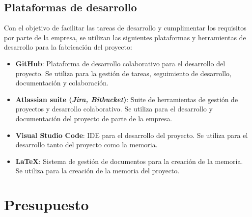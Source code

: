 \subsection{Plataformas de desarrollo}\label{subsec:plataformas}
Con el objetivo de facilitar las tareas de desarrollo y cumplimentar los requisitos por parte
de la empresa, se utilizan las siguientes plataformas y herramientas de desarrollo para la
fabricación del proyecto:

\begin{itemize}
	\item \textbf{GitHub}: Plataforma de desarrollo colaborativo para el desarrollo del proyecto.
		Se utiliza para la gestión de tareas, seguimiento de desarrollo, documentación y
		colaboración.
	\item \textbf{Atlassian suite (\emph{Jira, Bitbucket})}: Suite de herramientas de gestión de proyectos
		y desarrollo colaborativo. Se utiliza para el desarrollo y documentación del proyecto de
		parte de la empresa.
	\item \textbf{Visual Studio Code}: IDE para el desarrollo del proyecto. Se utiliza para el
		desarrollo tanto del proyecto como la memoria.
	\item \textbf{\LaTeX}: Sistema de gestión de documentos para la creación de la memoria.
		Se utiliza para la creación de la memoria del proyecto.
\end{itemize}

\newpage{}
\section{Presupuesto}\label{sec:presupuesto}
